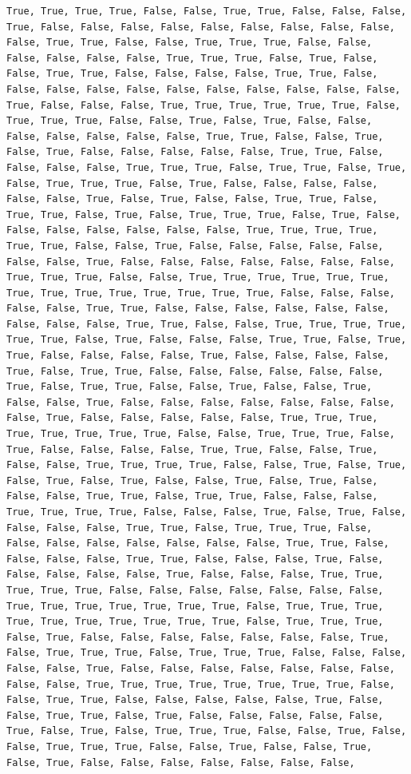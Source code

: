 \documentclass[
  letterpaper,
  DIV=11,
  numbers=noendperiod]{scrartcl}
\begin{document}
\begin{verbatim}
True, True, True, True, False, False, True, True, False, False, False, True, False, False, False, False, False, False, False, False, False, False, True, True, False, False, True, True, True, False, False, False, False, False, False, True, True, True, False, True, False, False, True, True, False, False, False, False, True, True, False, False, False, False, False, False, False, False, False, False, False, True, False, False, False, True, True, True, True, True, True, False, True, True, True, False, False, True, False, True, False, False, False, False, False, False, False, True, True, False, False, True, False, True, False, False, False, False, False, True, True, False, False, False, False, True, True, True, False, True, True, False, True, False, True, True, True, False, True, False, False, False, False, False, False, True, False, True, False, False, True, True, False, True, True, False, True, False, True, True, True, False, True, False, False, False, False, False, False, False, True, True, True, True, True, True, False, False, True, False, False, False, False, False, False, False, True, False, False, False, False, False, False, False, True, True, True, False, False, True, True, True, True, True, True, True, True, True, True, True, True, True, True, False, False, False, False, False, True, True, False, False, False, False, False, False, False, False, False, True, True, False, False, True, True, True, True, True, True, False, True, False, False, False, True, True, False, True, True, False, False, False, False, True, False, False, False, False, True, False, True, True, False, False, False, False, False, False, True, False, True, True, False, False, True, False, False, True, False, False, True, False, False, False, False, False, False, False, False, True, False, False, False, False, False, True, True, True, True, True, True, True, True, False, False, True, True, True, False, True, False, False, False, False, True, True, False, False, True, False, False, True, True, True, True, False, False, True, False, True, False, True, False, True, False, False, True, False, True, False, False, False, True, True, False, True, True, False, False, False, True, True, True, True, False, False, False, True, False, True, False, False, False, False, True, True, False, True, True, True, False, False, False, False, False, False, False, False, True, True, False, False, False, False, True, True, False, False, False, True, False, False, False, False, False, True, False, False, False, True, True, True, True, True, False, False, False, False, False, False, False, True, True, True, True, True, True, True, False, True, True, True, True, True, True, True, True, True, True, False, True, True, True, False, True, False, False, False, False, False, False, False, True, False, True, True, True, False, True, True, True, False, False, False, False, False, True, False, False, False, False, False, False, False, False, False, True, True, True, True, True, True, True, True, False, False, True, True, False, False, False, False, False, True, False, False, True, True, False, True, False, False, False, False, False, True, False, True, False, True, True, True, False, False, True, False, False, True, True, True, False, False, True, False, False, True, False, True, False, False, False, False, False, False, False, 
\end{verbatim}
\end{document}
